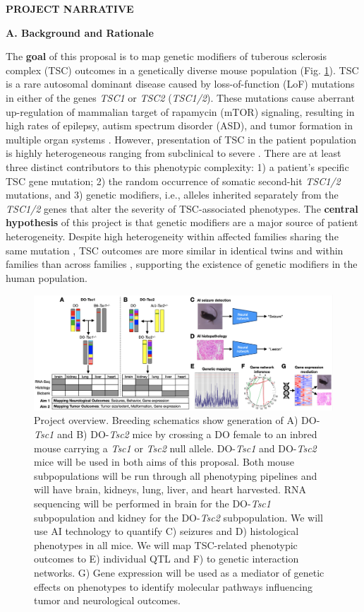 \documentclass[
  12pt,
]{article}
\author{}
\date{\vspace{-2.5em}}
\begin{document}
\textbf{PROJECT NARRATIVE}

\textbf{A. Background and Rationale}

The \textbf{goal} of this proposal is to map genetic modifiers of
tuberous sclerosis complex (TSC) outcomes in a genetically diverse mouse
population (Fig. \ref{fig:overview}). TSC is a rare autosomal dominant
disease caused by loss-of-function (LoF) mutations in either of the
genes \textit{TSC1} or \textit{TSC2} (\textit{TSC1/2}). These mutations
cause aberrant up-regulation of mammalian target of rapamycin (mTOR)
signaling, resulting in high rates of epilepsy, autism spectrum disorder
(ASD), and tumor formation in multiple organ systems \cite{17005952}.
However, presentation of TSC in the patient population is highly
heterogeneous ranging from subclinical to severe
\cite{gomez_tuberous_1999, 8423606, 17005952, 8057044, 29687738, 28127866, 29926239}.
There are at least three distinct contributors to this phenotypic
complexity: 1) a patient's specific TSC gene mutation; 2) the random
occurrence of somatic second-hit \textit{TSC1/2} mutations, and 3)
genetic modifiers, i.e., alleles inherited separately from the
\textit{TSC1/2} genes that alter the severity of TSC-associated
phenotypes. The \textbf{central hypothesis} of this project is that
genetic modifiers are a major source of patient heterogeneity. Despite
high heterogeneity within affected families sharing the same mutation
\cite{29687738, 28127866, 29926239}, TSC outcomes are more similar in
identical twins and within families than across families
\cite{18174550}, supporting the existence of genetic modifiers in the
human population.

\begin{figure}[ht!]
\includegraphics[width=\textwidth]{Fig1.png} 
\caption{Project overview. Breeding schematics show generation of A) DO-\textit{Tsc1} and B) DO-\textit{Tsc2} mice by crossing a DO female to an inbred mouse carrying a \textit{Tsc1} or \textit{Tsc2} null allele. DO-\textit{Tsc1} and DO-\textit{Tsc2} mice will be used in both aims of this proposal. Both mouse subpopulations will be run through all phenotyping pipelines and will have brain, kidneys, lung, liver, and heart harvested. RNA sequencing will be performed in brain for the DO-\textit{Tsc1} subpopulation and kidney for the DO-\textit{Tsc2} subpopulation. We will use AI technology to quantify C) seizures and D) histological phenotypes in all mice. We will map TSC-related phenotypic outcomes to E) individual QTL and F) to genetic interaction networks. G) Gene expression will be used as a mediator of genetic effects on phenotypes to identify molecular pathways influencing tumor and neurological outcomes.
}
\label{fig:overview}
\end{figure}
\end{document}
